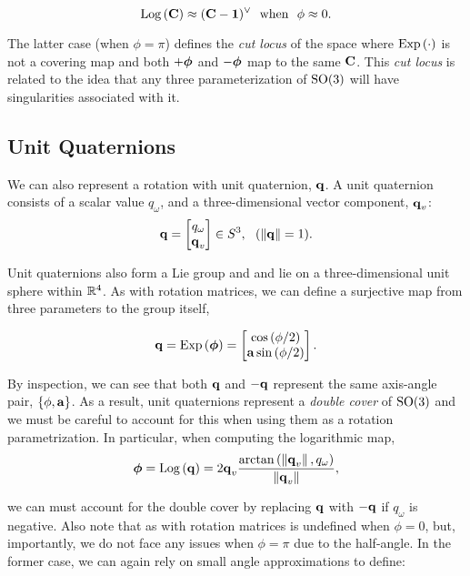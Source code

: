 \begin{equation}
	\mathrm{Log}\left({\boldsymbol{\mathbf{C}}}\right) \approx (\boldsymbol{\mathbf{C}} - \boldsymbol{\mathbf{1}})^\vee ~~ \textrm{when} ~~ \phi \approx 0. 
\end{equation}

The latter case (when $\phi = \pi$) defines the \textit{cut locus} of the space where $\mathrm{Exp}\left({\cdot}\right)$ is not a covering map and both $+\boldsymbol{\mathbf{\phi}}$ and $-\boldsymbol{\mathbf{\phi}}$ map to the same $\boldsymbol{\mathbf{C}}$. This \textit{cut locus} is related to the idea that any three parameterization of $\mathrm{SO}(3)$ will have singularities associated with it.

\subsection{Unit Quaternions}

We can also represent a rotation with unit quaternion, $\boldsymbol{\mathbf{q}}$. A unit quaternion consists of a scalar value $q_\omega$, and a three-dimensional vector component, $\boldsymbol{\mathbf{q}}_v$:
\begin{equation}
	\boldsymbol{\mathbf{q}} = \begin{bmatrix} q_\omega \\ \boldsymbol{\mathbf{q}}_v \end{bmatrix} \in S^3, ~~ (\left\Vert\boldsymbol{\mathbf{q}}\right\Vert = 1).
\end{equation}

Unit quaternions also form a Lie group \citep{Sola2018-kg} and and lie on a three-dimensional unit sphere within $\mathbb{R}{}^4$. As with rotation matrices, we can define a surjective map from three parameters to the group itself,

\begin{equation}
\boldsymbol{\mathbf{q}} = \mathrm{Exp}\left({\boldsymbol{\mathbf{\phi}}}\right) = \begin{bmatrix} \cos{(\phi/2)} \\ \boldsymbol{\mathbf{a}} \sin{(\phi/2)} \end{bmatrix}.	
\end{equation}

By inspection, we can see that both $\boldsymbol{\mathbf{q}}$ and $-\boldsymbol{\mathbf{q}}$ represent the same axis-angle pair, $\{\phi, \boldsymbol{\mathbf{a}}\}$. As a result, unit quaternions represent a \textit{double cover} of $\mathrm{SO}(3)$ and we must be careful to account for this when using them as a rotation parametrization.
In particular, when computing the logarithmic map,
\begin{align}
\label{eq:math_quat_log}
	\boldsymbol{\mathbf{\phi}} =  \mathrm{Log}\left({\boldsymbol{\mathbf{q}}}\right) = 2 \boldsymbol{\mathbf{q}}_v \frac{\arctan{(\left\Vert \boldsymbol{\mathbf{q}} _v\right\Vert ,  q_\omega})}{\left\Vert\boldsymbol{\mathbf{q}}_v\right\Vert},
\end{align}

\noindent we can must account for the double cover by replacing $\boldsymbol{\mathbf{q}}$ with $-\boldsymbol{\mathbf{q}}$ if $q_\omega$ is negative. Also note that as with rotation matrices  is undefined when $\phi = 0$, but, importantly, we do not face any issues when $\phi = \pi$ due to the half-angle. In the former case, we can again rely on small angle approximations to define:

